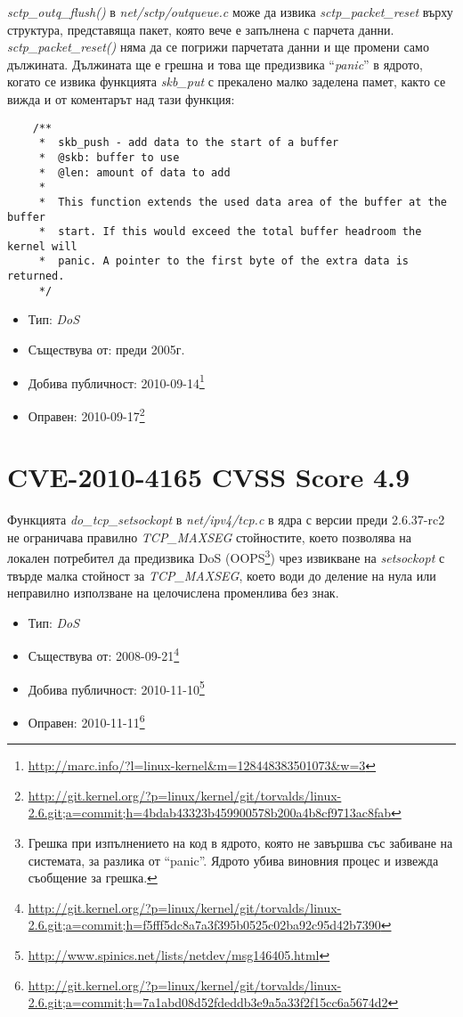 \documentclass[a4paper,12pt,leqno]{article}
\begin{document}
\textit{sctp\_outq\_flush()} в \textit{net/sctp/outqueue.c}
може да извика \textit{sctp\_packet\_reset} върху
структура, представяща пакет, която вече е запълнена с парчета данни.
\textit{sctp\_packet\_reset()} няма да се погрижи парчетата данни
и ще промени само дължината. Дължината ще е грешна и това ще предизвика
``\textit{panic}'' в ядрото, когато се извика функцията \textit{skb\_put} с
прекалено малко заделена памет, както се вижда и от коментарът над тази функция:
\begin{verbatim}
    /**
     *	skb_push - add data to the start of a buffer
     *	@skb: buffer to use
     *	@len: amount of data to add
     *
     *	This function extends the used data area of the buffer at the buffer
     *	start. If this would exceed the total buffer headroom the kernel will
     *	panic. A pointer to the first byte of the extra data is returned.
     */
\end{verbatim}

\begin{itemize}
    \item Тип: \textit{DoS}
    \item Съществува от: преди 2005г.
    \item Добива публичност: 2010-09-14\footnote{\url{http://marc.info/?l=linux-kernel&m=128448383501073&w=3}}
    \item Оправен: 2010-09-17\footnote{\url{http://git.kernel.org/?p=linux/kernel/git/torvalds/linux-2.6.git;a=commit;h=4bdab43323b459900578b200a4b8cf9713ac8fab}}
\end{itemize}


\section{CVE-2010-4165 CVSS Score 4.9} %
\label{sec:CVE-2010-4165 CVSS Score 4.9}

Функцията \textit{do\_tcp\_setsockopt} в \textit{net/ipv4/tcp.c} в ядра с версии преди 2.6.37-rc2
не ограничава правилно \textit{TCP\_MAXSEG} стойностите, което позволява на локален потребител да
предизвика DoS (OOPS\footnote{Грешка при изпълнението на код в ядрото, която не завършва със забиване на системата, за разлика от ``panic''. Ядрото
убива виновния процес и извежда съобщение за грешка.})
чрез извикване на \textit{setsockopt} с твърде малка стойност за \textit{TCP\_MAXSEG}, което води до деление на
нула или неправилно използване на целочислена променлива без знак.
\begin{itemize}
    \item Тип: \textit{DoS}
    \item Съществува от: 2008-09-21\footnote{\url{http://git.kernel.org/?p=linux/kernel/git/torvalds/linux-2.6.git;a=commit;h=f5fff5dc8a7a3f395b0525c02ba92c95d42b7390}}
    \item Добива публичност: 2010-11-10\footnote{\url{http://www.spinics.net/lists/netdev/msg146405.html}}
    \item Оправен: 2010-11-11\footnote{\url{http://git.kernel.org/?p=linux/kernel/git/torvalds/linux-2.6.git;a=commit;h=7a1abd08d52fdeddb3e9a5a33f2f15cc6a5674d2}}
\end{itemize}
\end{document}
